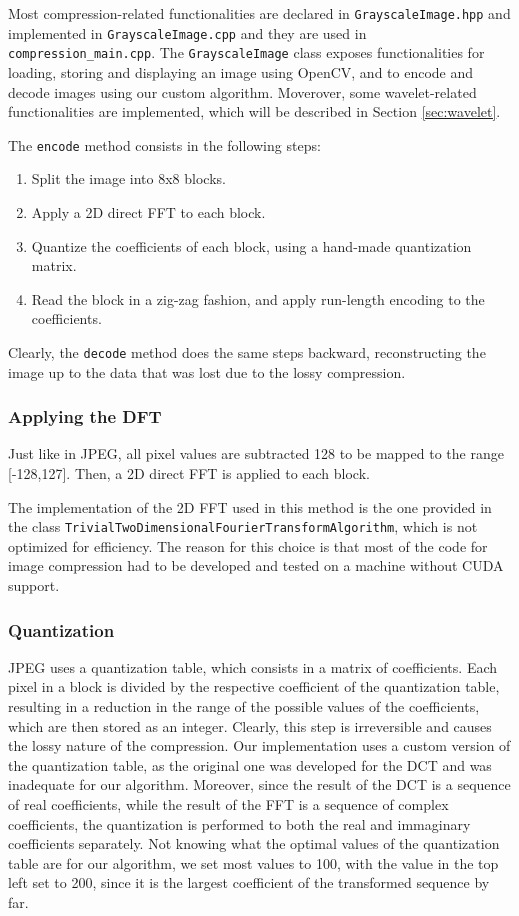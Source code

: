 Most compression-related functionalities are declared in \texttt{Grayscale\-Image.hpp} and implemented in \texttt{Grayscale\-Image.cpp} and they are used in \texttt{compression\_\-main\-.cpp}. The \texttt{GrayscaleImage} class exposes functionalities for loading, storing and displaying an image using OpenCV, and to encode and decode images using our custom algorithm. Moverover, some wavelet-related functionalities are implemented, which will be described in Section \ref{sec:wavelet}.

The \texttt{encode} method consists in the following steps:
\begin{enumerate}
    \item Split the image into 8x8 blocks.
    \item Apply a 2D direct FFT to each block.
    \item Quantize the coefficients of each block, using a hand-made quantization matrix.
    \item Read the block in a zig-zag fashion, and apply run-length encoding to the coefficients.
\end{enumerate}
Clearly, the \texttt{decode} method does the same steps backward, reconstructing the image up to the data that was lost due to the lossy compression.

\subsubsection{Applying the DFT}
Just like in JPEG, all pixel values are subtracted 128 to be mapped to the range [-128,127]. Then, a 2D direct FFT is applied to each block.

The implementation of the 2D FFT used in this method is the one provided in the class \texttt{Trivial\-Two\-Dimensional\-Fourier\-Transform\-Algorithm}, which is not optimized for efficiency. The reason for this choice is that most of the code for image compression had to be developed and tested on a machine without CUDA support.

\subsubsection{Quantization}
JPEG uses a quantization table, which consists in a matrix of coefficients. Each pixel in a block is divided by the respective coefficient of the quantization table, resulting in a reduction in the range of the possible values of the coefficients, which are then stored as an integer. Clearly, this step is irreversible and causes the lossy nature of the compression. Our implementation uses a custom version of the quantization table, as the original one was developed for the DCT and was inadequate for our algorithm. Moreover, since the result of the DCT is a sequence of real coefficients, while the result of the FFT is a sequence of complex coefficients, the quantization is performed to both the real and immaginary coefficients separately. Not knowing what the optimal values of the quantization table are for our algorithm, we set most values to 100, with the value in the top left set to 200, since it is the largest coefficient of the transformed sequence by far.

